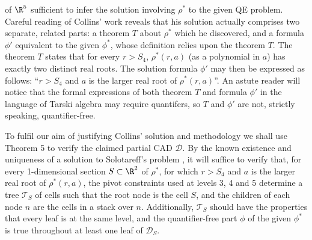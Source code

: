 \documentclass{article}
\begin{document}
of $\R^5$ sufficient to infer the solution involving $\rho^*$
to the given QE problem. Careful reading of Collins'
work reveals that his solution actually comprises two separate, related
parts: a theorem $T$ about $\rho^*$ which he discovered, and
a formula $\phi'$ equivalent to the given $\phi^*$, whose definition
relies upon the theorem $T$.
The theorem $T$ states that for every $r > S_4$, $\rho^*(r,a)$
(as a polynomial in $a$) has exactly two distinct real roots.
The solution formula $\phi'$ may then be expressed as follows:
``$r > S_4$ and $a$ is the larger real root of $\rho^*(r,a)$''.
An astute reader will notice that the formal expressions of both
theorem $T$ and formula $\phi'$ in the language of Tarski algebra may 
require quantifers, so $T$ and $\phi'$ are not, 
strictly speaking, quantifier-free.

To fulfil our aim of justifying Collins' solution and methodology
we shall use Theorem 5 to verify the claimed partial CAD
$\mathcal{D}$.
By the known existence and uniqueness of a solution to
Solotareff's problem \cite{Achieser1956},
it will suffice to verify that, for every 1-dimensional section
$S \subset \R^2$ of $\rho^*$,
for which $r > S_4$ and $a$ is the larger real root of $\rho^*(r,a)$,
the pivot constraints used at levels 3, 4 and 5 determine a tree
$\mathcal{T}_S$ of cells such that the root node is the cell $S$,
and the children of each node $n$ are the cells in a stack over $n$.
Additionally, $\mathcal{T}_S$ should have the properties that
every leaf is at the same level, and the quantifier-free
part $\phi$ of the given $\phi^*$ is true throughout at least one
leaf of $\mathcal{D}_S$.
\end{document}
